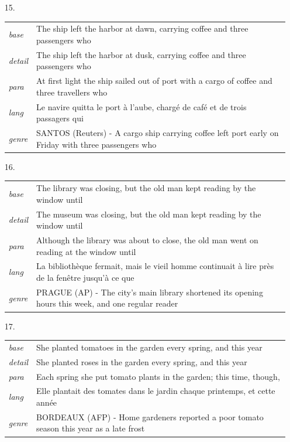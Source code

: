 \documentclass[11pt]{article}
\theoremstyle{definition}
\theoremstyle{remark}
\begin{document}
{\begin{itemize}
\item[15.] \begin{tabular}[t]{@{}ll@{}}\emph{base} & \parbox[t]{0.78\linewidth}{The ship left the harbor at dawn, carrying coffee and three passengers who}\\\emph{detail} & \parbox[t]{0.78\linewidth}{The ship left the harbor at dusk, carrying coffee and three passengers who}\\\emph{para} & \parbox[t]{0.78\linewidth}{At first light the ship sailed out of port with a cargo of coffee and three travellers who}\\\emph{lang} & \parbox[t]{0.78\linewidth}{Le navire quitta le port à l'aube, chargé de café et de trois passagers qui}\\\emph{genre} & \parbox[t]{0.78\linewidth}{SANTOS (Reuters) - A cargo ship carrying coffee left port early on Friday with three passengers who}\\\end{tabular}
\item[16.] \begin{tabular}[t]{@{}ll@{}}\emph{base} & \parbox[t]{0.78\linewidth}{The library was closing, but the old man kept reading by the window until}\\\emph{detail} & \parbox[t]{0.78\linewidth}{The museum was closing, but the old man kept reading by the window until}\\\emph{para} & \parbox[t]{0.78\linewidth}{Although the library was about to close, the old man went on reading at the window until}\\\emph{lang} & \parbox[t]{0.78\linewidth}{La bibliothèque fermait, mais le vieil homme continuait à lire près de la fenêtre jusqu'à ce que}\\\emph{genre} & \parbox[t]{0.78\linewidth}{PRAGUE (AP) - The city's main library shortened its opening hours this week, and one regular reader}\\\end{tabular}
\item[17.] \begin{tabular}[t]{@{}ll@{}}\emph{base} & \parbox[t]{0.78\linewidth}{She planted tomatoes in the garden every spring, and this year}\\\emph{detail} & \parbox[t]{0.78\linewidth}{She planted roses in the garden every spring, and this year}\\\emph{para} & \parbox[t]{0.78\linewidth}{Each spring she put tomato plants in the garden; this time, though,}\\\emph{lang} & \parbox[t]{0.78\linewidth}{Elle plantait des tomates dans le jardin chaque printemps, et cette année}\\\emph{genre} & \parbox[t]{0.78\linewidth}{BORDEAUX (AFP) - Home gardeners reported a poor tomato season this year as a late frost}\\\end{tabular}

\end{itemize}}
\end{document}
